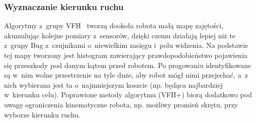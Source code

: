 
\subsubsection{Wyznaczanie kierunku ruchu}

Algorytmy z~grupy VFH~\cite{borenstein1991vector} tworzą dookoła robota małą mapę zajętości, akumulując kolejne
pomiary z~sensorów, dzięki czemu działają lepiej niż te z~grupy Bug z~czujnikami
o~niewielkim zasięgu i~polu widzenia. Na podstawie tej mapy tworzony jest histogram
zawierający prawdopodobieństwo pojawienia się przeszkody pod danym kątem przed robotem.
Po progowaniu identyfikowane są w~nim wolne przestrzenie na tyle duże, aby robot mógł
nimi przejechać, a~z nich wybierana jest ta o~najmniejszym koszcie (np. będąca najbardziej
w~kierunku celu). Poprawione metody algorytmu (VFH+) biorą dodatkowo pod uwagę
ograniczenia kinematyczne robota, np. możliwy promień skrętu, przy wyborze kierunku ruchu.

